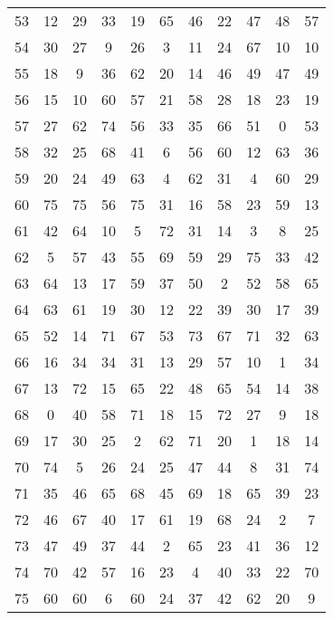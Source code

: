 \begin{table}
\begin{tabular}{c c c c c c c c c c c }
53 & 12 & 29 & 33 & 19 & 65 & 46 & 22 & 47 & 48 & 57 \\
54 & 30 & 27 & 9 & 26 & 3 & 11 & 24 & 67 & 10 & 10 \\
55 & 18 & 9 & 36 & 62 & 20 & 14 & 46 & 49 & 47 & 49 \\
56 & 15 & 10 & 60 & 57 & 21 & 58 & 28 & 18 & 23 & 19 \\
57 & 27 & 62 & 74 & 56 & 33 & 35 & 66 & 51 & 0 & 53 \\
58 & 32 & 25 & 68 & 41 & 6 & 56 & 60 & 12 & 63 & 36 \\
59 & 20 & 24 & 49 & 63 & 4 & 62 & 31 & 4 & 60 & 29 \\
60 & 75 & 75 & 56 & 75 & 31 & 16 & 58 & 23 & 59 & 13 \\
61 & 42 & 64 & 10 & 5 & 72 & 31 & 14 & 3 & 8 & 25 \\
62 & 5 & 57 & 43 & 55 & 69 & 59 & 29 & 75 & 33 & 42 \\
63 & 64 & 13 & 17 & 59 & 37 & 50 & 2 & 52 & 58 & 65 \\
64 & 63 & 61 & 19 & 30 & 12 & 22 & 39 & 30 & 17 & 39 \\
65 & 52 & 14 & 71 & 67 & 53 & 73 & 67 & 71 & 32 & 63 \\
66 & 16 & 34 & 34 & 31 & 13 & 29 & 57 & 10 & 1 & 34 \\
67 & 13 & 72 & 15 & 65 & 22 & 48 & 65 & 54 & 14 & 38 \\
68 & 0 & 40 & 58 & 71 & 18 & 15 & 72 & 27 & 9 & 18 \\
69 & 17 & 30 & 25 & 2 & 62 & 71 & 20 & 1 & 18 & 14 \\
70 & 74 & 5 & 26 & 24 & 25 & 47 & 44 & 8 & 31 & 74 \\
71 & 35 & 46 & 65 & 68 & 45 & 69 & 18 & 65 & 39 & 23 \\
72 & 46 & 67 & 40 & 17 & 61 & 19 & 68 & 24 & 2 & 7 \\
73 & 47 & 49 & 37 & 44 & 2 & 65 & 23 & 41 & 36 & 12 \\
74 & 70 & 42 & 57 & 16 & 23 & 4 & 40 & 33 & 22 & 70 \\
75 & 60 & 60 & 6 & 60 & 24 & 37 & 42 & 62 & 20 & 9 \\
\hline
\end{tabular}
\end{table}